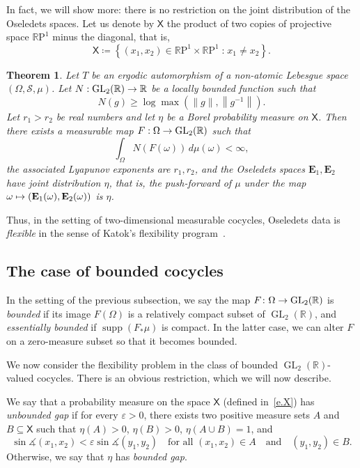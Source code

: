 \documentclass[10pt]{amsart}
\newtheorem{theo}{Theorem}[section]
\theoremstyle{definition}\newtheorem{defi}[theo]{Definition}\newtheorem{rema}[theo]{Remark}\newtheorem{exam}[theo]{Example}\newtheorem{exem}[theo]{Example}\newtheorem{nota}[theo]{Notation}
\DeclareMathOperator{\supp}{supp}
\newcommand{\R}{\mathbb{R}}
\newcommand{\E}{\mathbf{E}}
\newcommand{\sfX}{\mathsf{X}}
\newcommand{\st}{\;\mathord{:}\;}
\newcommand{\clS}{\mathcal{S}}
\newcommand{\rmP}{\mathrm{P}}
\DeclareMathOperator{\GL}{GL}
\renewcommand{\epsilon}{\varepsilon}
\renewcommand{\angle}{\measuredangle}
\renewcommand*{\to}{\mathchoice{\longrightarrow}{\rightarrow}{\rightarrow}{\rightarrow}}
\let\oldmapsto\mapsto
\renewcommand*{\mapsto}{\mathchoice{\longmapsto}{\oldmapsto}{\oldmapsto}{\oldmapsto}}
\begin{document}
In fact, we will show more: there is no restriction on the joint distribution of the Oseledets spaces. Let us denote by $\sfX$ the product of two copies of projective space $\R\rmP^1$ minus the diagonal, that is,
\begin{equation}\label{e.X}
\sfX \coloneqq \left\{(x_1,x_2) \in \R\rmP^1 \times \R\rmP^1 \st x_1 \neq x_2 \right\}.
\end{equation}

\begin{theo}\label{t.flexible}
Let $T$ be an ergodic automorphism of a non-atomic Lebesgue space $(\Omega,\clS,\mu)$. Let $N:\GL_2(\R) \to \R$ be a locally bounded function such that
\begin{equation}\label{e.lowerN}
N(g) \ge \log \max\left(\|g\|, \left\|g^{-1}\right\|\right).
\end{equation}
Let $r_1 > r_2$ be real numbers and let $\eta$ be a Borel probability measure on $\sfX$. Then there exists a measurable map $F:\Omega \to \GL_2(\R)$ such that
\begin{equation}\label{e.super-integrability}
\int_{\Omega} N(F(\omega)) \, d\mu(\omega) < \infty,
\end{equation}
the associated Lyapunov exponents are $r_1,r_2$, and the Oseledets spaces $\E_1,\E_2$ have joint distribution $\eta$, that is, the push-forward of $\mu$ under the map $\omega \mapsto (\E_1(\omega),\E_2(\omega))$ is $\eta$.
\end{theo}

Thus, in the setting of two-dimensional measurable cocycles, Oseledets data is \emph{flexible} in the sense of Katok's flexibility program~\cite{BKRH}.


\subsection{The case of bounded cocycles}

In the setting of the previous subsection, we say the map $F \colon \Omega \to \GL_2(\R)$ is \emph{bounded} if its image $F(\Omega)$ is a relatively compact subset of $\GL_2(\R)$, and \emph{essentially bounded} if $\supp(F_*\mu)$ is compact. In the latter case, we can alter $F$ on a zero-measure subset so that it becomes bounded.

We now consider the flexibility problem in the class of bounded $\GL_2(\R)$-valued cocycles. There is an obvious restriction, which we will now describe.

We say that a probability measure on the space $\sfX$ (defined in~\eqref{e.X}) has \emph{unbounded gap} if for every $\epsilon>0$, there exists two positive measure sets $A$ and $B \subseteq \sfX$ such that $\eta(A)>0$, $\eta(B)>0$, $\eta(A \cup B) = 1$, and
\begin{equation}
\sin \angle(x_1,x_2) < \epsilon \sin\angle(y_1,y_2) \quad \text{for all }(x_1,x_2)\in A\quad\text{and}\quad (y_1,y_2)\in B.
\end{equation}
Otherwise, we say that $\eta$ has \emph{bounded gap}.
\end{document}

